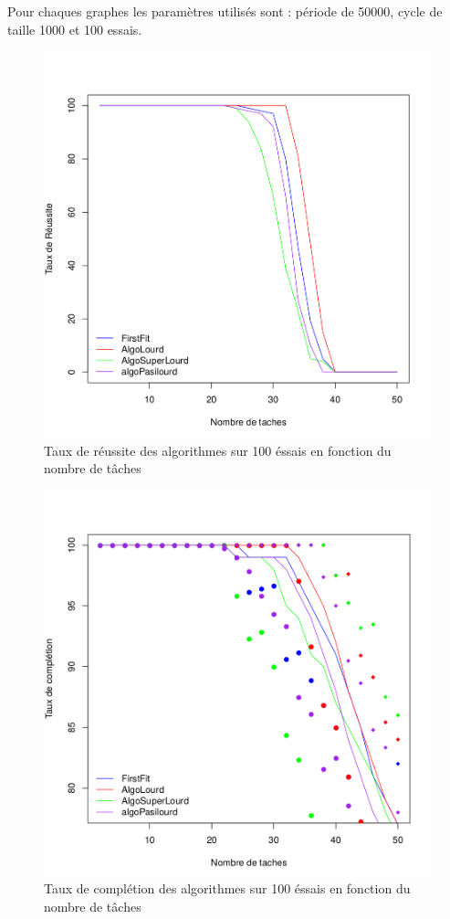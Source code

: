 \documentclass[11pt]{article}
\begin{document}
Pour chaques graphes les paramètres utilisés sont : période de 50000, cycle de taille 1000 et 100 essais.
\begin{figure}[!ht]
    \center
    \includegraphics[scale = 0.4]{taux_reussite}
    \caption{Taux de réussite des algorithmes sur 100 éssais en fonction du nombre de tâches}
\end{figure} 

\begin{figure}[!ht]
    \center
    \includegraphics[scale = 0.4]{taux_completion}
    \caption{Taux de complétion des algorithmes sur 100 éssais en fonction du nombre de tâches}
\end{figure}
\end{document}
